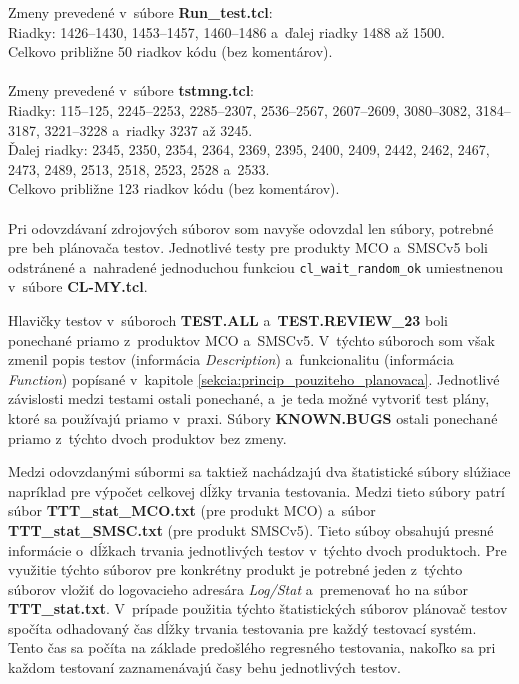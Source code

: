 \noindent Zmeny prevedené v~súbore \textbf{Run\_test.tcl}: \\
Riadky: 1426--1430, 1453--1457, 1460--1486 a~ďalej riadky 1488 až 1500.\\
Celkovo približne 50 riadkov kódu (bez komentárov).
\\
\\
\noindent Zmeny prevedené v~súbore \textbf{tstmng.tcl}: \\
Riadky: 115--125, 2245--2253, 2285--2307, 2536--2567, 2607--2609, 
3080--3082, 3184--3187, 3221--3228 a~riadky 3237 až 3245. \\
Ďalej riadky: 2345, 2350, 2354, 2364, 2369, 2395, 2400, 2409, 2442, 
2462, 2467, 2473, 2489, 2513, 2518, 2523, 2528 a~2533. \\
Celkovo približne 123 riadkov kódu (bez komentárov).
\\
\\
Pri odovzdávaní zdrojových súborov som navyše odovzdal len súbory,
potrebné pre beh plánovača testov. Jednotlivé testy pre produkty MCO
a~SMSCv5 boli odstránené a~nahradené jednoduchou funkciou 
\texttt{cl\_wait\_random\_ok} umiestnenou v~súbore \textbf{CL-MY.tcl}. 

Hlavičky testov v~súboroch \textbf{TEST.ALL} a~\textbf{TEST.REVIEW\_23} 
boli ponechané priamo z~produktov MCO a~SMSCv5. V~týchto súboroch som 
však zmenil popis testov (informácia \textit{Description}) 
a~funkcionalitu (informácia \textit{Function}) popísané v~kapitole 
\ref{sekcia:princip_pouziteho_planovaca}.
Jednotlivé závislosti medzi testami ostali ponechané, a~je teda možné 
vytvoriť test plány, ktoré sa používajú priamo v~praxi.
Súbory \textbf{KNOWN.BUGS} ostali ponechané priamo z~týchto dvoch 
produktov bez zmeny. 

Medzi odovzdanými súbormi sa taktiež nachádzajú dva štatistické súbory 
slúžiace napríklad pre výpočet celkovej dĺžky trvania testovania. 
Medzi tieto súbory patrí súbor \textbf{TTT\_stat\_MCO.txt} (pre produkt MCO) 
a~súbor \textbf{TTT\_stat\_SMSC.txt} (pre produkt SMSCv5).
Tieto súboy obsahujú presné informácie o~dĺžkach trvania jednotlivých 
testov v~týchto dvoch produktoch. 
Pre využitie týchto súborov pre konkrétny produkt je potrebné jeden 
z~týchto súborov vložiť do logovacieho adresára \textit{Log/Stat} 
a~premenovať ho na súbor \textbf{TTT\_stat.txt}.
V~prípade použitia týchto štatistických súborov plánovač testov spočíta
odhadovaný čas dĺžky trvania testovania pre každý testovací systém.
Tento čas sa počíta na základe predošlého regresného testovania,
nakoľko sa pri každom testovaní zaznamenávajú časy behu jednotlivých 
testov.



